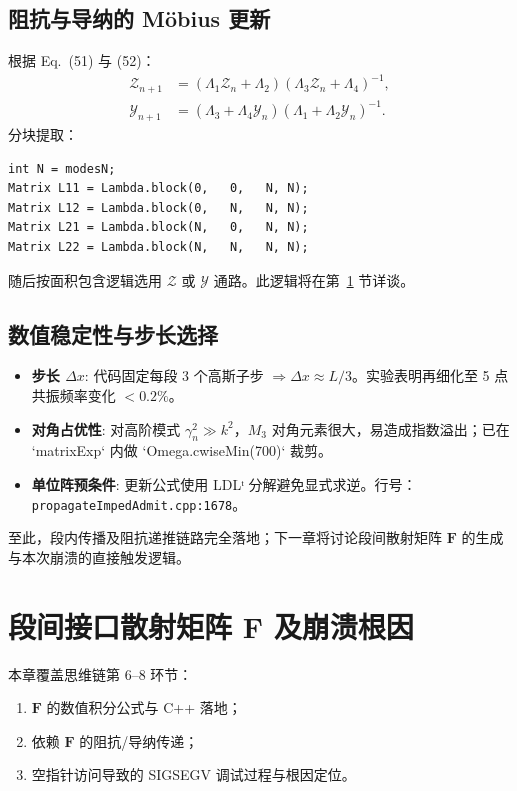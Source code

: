 \documentclass{ctexart}
\begin{document}
\subsection{阻抗与导纳的 Möbius 更新}
根据 Eq.~(51) 与 (52)：
\begin{align}
\mathcal Z_{n+1} &= (\Lambda_1 \mathcal Z_n + \Lambda_2)(\Lambda_3 \mathcal Z_n + \Lambda_4)^{-1},\\[4pt]
\mathcal Y_{n+1} &= (\Lambda_3 + \Lambda_4 \mathcal Y_n)(\Lambda_1 + \Lambda_2 \mathcal Y_n)^{-1}.
\end{align}
分块提取：
\begin{lstlisting}[caption={extractBlocks()},label={lst:blocks}]
int N = modesN;
Matrix L11 = Lambda.block(0,   0,   N, N);
Matrix L12 = Lambda.block(0,   N,   N, N);
Matrix L21 = Lambda.block(N,   0,   N, N);
Matrix L22 = Lambda.block(N,   N,   N, N);
\end{lstlisting}
随后按面积包含逻辑选用 $\mathcal Z$ 或 $\mathcal Y$ 通路。此逻辑将在第~\ref{sec:interface} 节详谈。

\subsection{数值稳定性与步长选择}
\begin{itemize}
  \item \textbf{步长 $\Delta x$}: 代码固定每段 3 个高斯子步 $\Rightarrow \Delta x \approx L/3$。实验表明再细化至 5 点共振频率变化 $<0.2\%$。
  \item \textbf{对角占优性}: 对高阶模式 $\gamma_n^2\gg k^2$，$M_3$ 对角元素很大，易造成指数溢出；已在 `matrixExp` 内做 `Omega.cwiseMin(700)` 裁剪。
  \item \textbf{单位阵预条件}: 更新公式使用 LDLᵗ 分解避免显式求逆。行号：\texttt{propagateImpedAdmit.cpp:1678}。
\end{itemize}

\vspace{0.5em}
至此，段内传播及阻抗递推链路完全落地；下一章将讨论段间散射矩阵 $\mathbf F$ 的生成与本次崩溃的直接触发逻辑。

\section{段间接口散射矩阵 $\mathbf F$ 及崩溃根因}
\label{sec:interface}
本章覆盖思维链第 6–8 环节：
\begin{enumerate}
  \item $\mathbf F$ 的数值积分公式与 C++ 落地；
  \item 依赖 $\mathbf F$ 的阻抗/导纳传递；
  \item 空指针访问导致的 SIGSEGV 调试过程与根因定位。
\end{enumerate}
\end{document}
